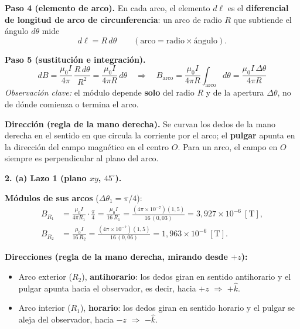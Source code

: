 \documentclass[12pt,letterpaper]{article}
\newcommand{\secgap}{\vspace{0.6cm}}
\newcommand{\kk}{\hat{k}}
\begin{document}
\noindent\textbf{Paso 4 (elemento de arco).} En cada arco, el elemento $d\ell$ es el
\textbf{diferencial de longitud de arco de circunferencia}: un arco de radio $R$ que subtiende el
\'angulo $d\theta$ mide
\[
    d\ell = R\,d\theta \qquad(\text{arco} = \text{radio}\times\text{\'angulo}).
\]

\noindent\textbf{Paso 5 (sustituci\'on e integraci\'on).}
\[
    dB = \frac{\mu_0 I}{4\pi}\,\frac{R\,d\theta}{R^{2}} = \frac{\mu_0 I}{4\pi R}\,d\theta
    \quad\Longrightarrow\quad
    \boxed{B_{\text{arco}} = \frac{\mu_0 I}{4\pi R}\int_{\text{arco}} d\theta = \frac{\mu_0 I\,\Delta\theta}{4\pi R}}
\]
\noindent\textit{Observaci\'on clave:} el m\'odulo depende \textbf{solo} del radio $R$ y de la
apertura $\Delta\theta$, no de d\'onde comienza o termina el arco.

\noindent\textbf{Direcci\'on (regla de la mano derecha).} Se curvan los dedos de la mano derecha en
el sentido en que circula la corriente por el arco; el \textbf{pulgar} apunta en la direcci\'on del
campo magn\'etico en el centro $O$. Para un arco, el campo en $O$ siempre es perpendicular al plano
del arco.

\secgap

\noindent\textbf{2. (a) Lazo 1 (plano $xy$, $45^\circ$).}

\noindent\textbf{M\'odulos de sus arcos} ($\Delta\theta_1 = \pi/4$):
\begin{align*}
    B_{R_1} &= \frac{\mu_0 I}{4\pi R_1}\cdot\frac{\pi}{4} = \frac{\mu_0 I}{16\,R_1}
             = \frac{(4\pi\times10^{-7})(1{,}5)}{16\,(0{,}03)} = 3{,}927\times10^{-6}\ [\text{T}],\\
    B_{R_2} &= \frac{\mu_0 I}{16\,R_2}
             = \frac{(4\pi\times10^{-7})(1{,}5)}{16\,(0{,}06)} = 1{,}963\times10^{-6}\ [\text{T}].
\end{align*}

\noindent\textbf{Direcciones (regla de la mano derecha, mirando desde $+z$):}
\begin{itemize}\setlength\itemsep{2pt}
    \item Arco exterior ($R_2$), \textbf{antihorario}: los dedos giran en sentido antihorario y el
          pulgar apunta hacia el observador, es decir, hacia $+z$ $\Rightarrow$ $+\kk$.
    \item Arco interior ($R_1$), \textbf{horario}: los dedos giran en sentido horario y el pulgar se
          aleja del observador, hacia $-z$ $\Rightarrow$ $-\kk$.
\end{itemize}
\end{document}
